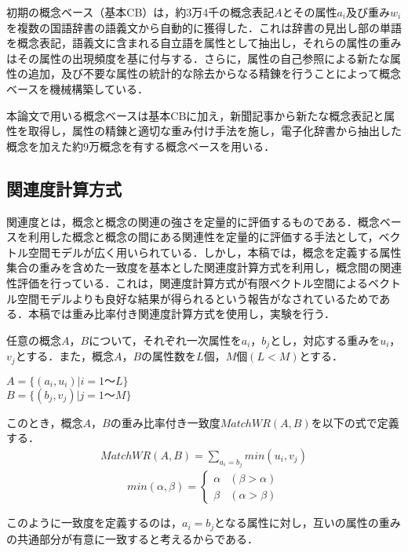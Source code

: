 初期の概念ベース（基本CB）\cite{Kasahara1997}は，約3万4千の概念表記$A$とその属性$a_i$及び重み$w_i$を複数の国語辞書の語義文から自動的に獲得した．これは辞書の見出し部の単語を概念表記，語義文に含まれる自立語を属性として抽出し，それらの属性の重みはその属性の出現頻度を基に付与する．さらに，属性の自己参照による新たな属性の追加，及び不要な属性の統計的な除去からなる精錬を行うことによって概念ベースを機械構築している．

本論文で用いる概念ベースは基本CB\cite{Kasahara1997}に加え，新聞記事から新たな概念表記と属性を取得し，属性の精錬と適切な重み付け手法を施し，電子化辞書から抽出した概念を加えた約9万概念を有する概念ベース\cite{okumura2005}を用いる．


\subsection{関連度計算方式}\label{keisan}
関連度とは，概念と概念の関連の強さを定量的に評価するものである．概念ベースを利用した概念と概念の間にある関連性を定量的に評価する手法として，ベクトル空間モデルが広く用いられている．しかし，本稿では，概念を定義する属性集合の重みを含めた一致度を基本とした関連度計算方式を利用し，概念間の関連性評価を行っている．これは，関連度計算方式が有限ベクトル空間によるベクトル空間モデルよりも良好な結果が得られるという報告がなされているためである\cite{watabe2001}．本稿では重み比率付き関連度計算方式を使用し，実験を行う．

任意の概念$A$，$B$について，それぞれ一次属性を$a_i$，$b_j$とし，対応する重みを$u_i$，$v_j$とする．また，概念$A$，$B$の属性数を$L$個，$M$個$(L<M)$とする．
\begin{center}
$A=\{(a_i,u_i)|i=1〜L\}$ \\
$B=\{(b_j,v_j)|j=1〜M\}$
\end{center}
このとき，概念$A$，$B$の重み比率付き一致度$MatchWR(A,B)$を以下の式で定義する．
\begin{eqnarray}
MatchWR(A,B)=\sum_{a_i=b_j}min(u_i,v_j)

\end{eqnarray}
\begin{equation}
min(\alpha,\beta)=\left\{
\begin{array}{ll}
\alpha & (\beta > \alpha) \\
\beta & (\alpha > \beta)
\end{array}\right. 
\end{equation}

このように一致度を定義するのは，$a_i=b_j$となる属性に対し，互いの属性の重みの共通部分が有意に一致すると考えるからである．

